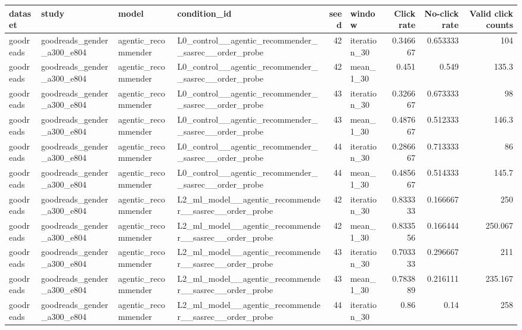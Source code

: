 \begin{table}[htbp!]
\centering
\small
\setlength{\tabcolsep}{3pt}
\renewcommand{\arraystretch}{1.1}
\begin{tabular}{llllrlrrr}
\hline
dataset & study & model & condition\_id & seed & window & Click rate & No-click rate & Valid click counts \\
\hline
goodreads & goodreads\_gender\_a300\_e804 & agentic\_recommender & L0\_control\_\_agentic\_recommender\_\_sasrec\_\_order\_probe & 42 & iteration\_30 & 0.346667 & 0.653333 & 104 \\
goodreads & goodreads\_gender\_a300\_e804 & agentic\_recommender & L0\_control\_\_agentic\_recommender\_\_sasrec\_\_order\_probe & 42 & mean\_1\_30 & 0.451 & 0.549 & 135.3 \\
goodreads & goodreads\_gender\_a300\_e804 & agentic\_recommender & L0\_control\_\_agentic\_recommender\_\_sasrec\_\_order\_probe & 43 & iteration\_30 & 0.326667 & 0.673333 & 98 \\
goodreads & goodreads\_gender\_a300\_e804 & agentic\_recommender & L0\_control\_\_agentic\_recommender\_\_sasrec\_\_order\_probe & 43 & mean\_1\_30 & 0.487667 & 0.512333 & 146.3 \\
goodreads & goodreads\_gender\_a300\_e804 & agentic\_recommender & L0\_control\_\_agentic\_recommender\_\_sasrec\_\_order\_probe & 44 & iteration\_30 & 0.286667 & 0.713333 & 86 \\
goodreads & goodreads\_gender\_a300\_e804 & agentic\_recommender & L0\_control\_\_agentic\_recommender\_\_sasrec\_\_order\_probe & 44 & mean\_1\_30 & 0.485667 & 0.514333 & 145.7 \\
goodreads & goodreads\_gender\_a300\_e804 & agentic\_recommender & L2\_ml\_model\_\_agentic\_recommender\_\_sasrec\_\_order\_probe & 42 & iteration\_30 & 0.833333 & 0.166667 & 250 \\
goodreads & goodreads\_gender\_a300\_e804 & agentic\_recommender & L2\_ml\_model\_\_agentic\_recommender\_\_sasrec\_\_order\_probe & 42 & mean\_1\_30 & 0.833556 & 0.166444 & 250.067 \\
goodreads & goodreads\_gender\_a300\_e804 & agentic\_recommender & L2\_ml\_model\_\_agentic\_recommender\_\_sasrec\_\_order\_probe & 43 & iteration\_30 & 0.703333 & 0.296667 & 211 \\
goodreads & goodreads\_gender\_a300\_e804 & agentic\_recommender & L2\_ml\_model\_\_agentic\_recommender\_\_sasrec\_\_order\_probe & 43 & mean\_1\_30 & 0.783889 & 0.216111 & 235.167 \\
goodreads & goodreads\_gender\_a300\_e804 & agentic\_recommender & L2\_ml\_model\_\_agentic\_recommender\_\_sasrec\_\_order\_probe & 44 & iteration\_30 & 0.86 & 0.14 & 258 \\

\end{tabular}
\end{table}

